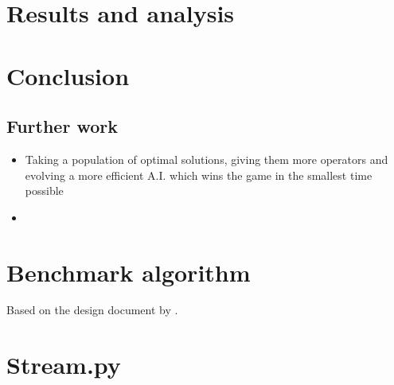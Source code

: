 \documentclass[british,10pt,a4paper]{article}
\begin{document}
\section{Results and analysis}
\section{Conclusion}
\subsection{Further work}
\begin{itemize}
	\item Taking a population of optimal solutions, giving them more operators and evolving a more efficient A.I. which wins the game in the smallest time possible
	\item 
\end{itemize}

\clearpage



\clearpage
\begin{appendices}

	\section{Benchmark algorithm}\label{app:approach1}
	Based on the design document by \citet{Ehlis2000-sz}. \newline
	
  	\clearpage	

  	\section{Stream.py}\label{app:stream}
  	\clearpage

\end{appendices}
\clearpage
\end{document}
